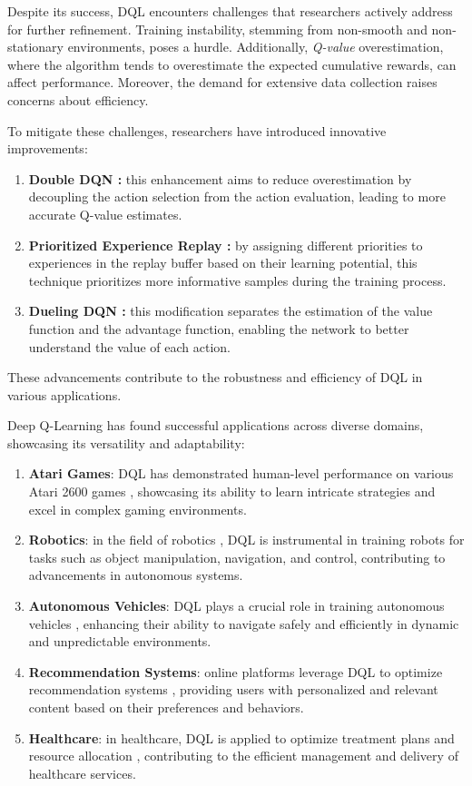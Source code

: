 \documentclass[12pt,a4paper,openright,twoside]{book}
\begin{document}
Despite its success, DQL encounters challenges that researchers actively address for further refinement. Training instability, stemming from non-smooth and non-stationary environments, poses a hurdle. Additionally, \emph{Q-value} overestimation, where the algorithm tends to overestimate the expected cumulative rewards, can affect performance. Moreover, the demand for extensive data collection raises concerns about efficiency.

To mitigate these challenges, researchers have introduced innovative improvements:

\begin{enumerate}
    \item \textbf{Double DQN \cite{vanhasselt2015deep}:} this enhancement aims to reduce overestimation by decoupling the action selection from the action evaluation, leading to more accurate Q-value estimates.
    \item \textbf{Prioritized Experience Replay \cite{schaul2016prioritized}:} by assigning different priorities to experiences in the replay buffer based on their learning potential, this technique prioritizes more informative samples during the training process.
    \item \textbf{Dueling DQN \cite{wang2016dueling}:} this modification separates the estimation of the value function and the advantage function, enabling the network to better understand the value of each action.
\end{enumerate}
These advancements contribute to the robustness and efficiency of DQL in various applications.

Deep Q-Learning has found successful applications across diverse domains, showcasing its versatility and adaptability:

\begin{enumerate}
\item \textbf{Atari Games}: DQL has demonstrated human-level performance on various Atari 2600 games \cite{mnih2013playing}, showcasing its ability to learn intricate strategies and excel in complex gaming environments.
\item \textbf{Robotics}: in the field of robotics \cite{quillen2018deep}, DQL is instrumental in training robots for tasks such as object manipulation, navigation, and control, contributing to advancements in autonomous systems.
\item \textbf{Autonomous Vehicles}: DQL plays a crucial role in training autonomous vehicles \cite{liu2023comparative}, enhancing their ability to navigate safely and efficiently in dynamic and unpredictable environments.
\item \textbf{Recommendation Systems}: online platforms leverage DQL to optimize recommendation systems \cite{CHEN2023110335}, providing users with personalized and relevant content based on their preferences and behaviors.
\item \textbf{Healthcare}: in healthcare, DQL is applied to optimize treatment plans and resource allocation \cite{MUNDRU202339}, contributing to the efficient management and delivery of healthcare services.
\end{enumerate}
\end{document}
